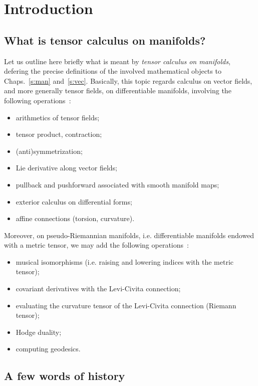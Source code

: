 \chapter{Introduction} \label{s:int}

\minitoc

\section{What is tensor calculus on manifolds?}

Let us outline here briefly what is meant by
\emph{tensor calculus on manifolds}, defering the precise definitions of the involved mathematical objects to Chaps.~\ref{s:man} and~\ref{s:vec}.
Basically, this topic regards calculus on vector fields,
and more generally tensor fields, on differentiable manifolds, involving the following operations~\cite{Lee13}:
\begin{itemize}
\item arithmetics of tensor fields;
\item tensor product, contraction;
\item (anti)symmetrization;
\item Lie derivative along vector fields;
\item pullback and pushforward associated with smooth manifold maps;
\item exterior calculus on differential forms;
\item affine connections (torsion, curvature).
\end{itemize}
Moreover, on pseudo-Riemannian manifolds, i.e. differentiable manifolds endowed
with a metric tensor, we may add the following
operations~\cite{Lee97,ONeil83}:
\begin{itemize}
\item musical isomorphisms (i.e. raising and lowering indices with the metric tensor);
\item covariant derivatives with the Levi-Civita connection;
\item evaluating the curvature tensor of the Levi-Civita connection (Riemann tensor);
\item Hodge duality;
\item computing geodesics.
\end{itemize}


\section{A few words of history}

